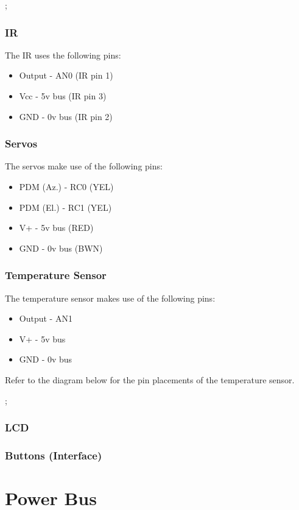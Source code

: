 \documentclass[]{report}
\begin{document}
;
\label{PanTiltPins}

\subsection{IR}
The IR uses the following pins:
\begin{itemize}
	\item Output - AN0 (IR pin 1)
	\item Vcc - 5v bus (IR pin 3)
	\item GND - 0v bus (IR pin 2)
\end{itemize}

\subsection{Servos}
The servos make use of the following pins:
\begin{itemize}
	\item PDM (Az.) - RC0 (YEL)
	\item PDM (El.) - RC1 (YEL)
	\item V+ - 5v bus (RED)
	\item GND - 0v bus (BWN)
\end{itemize}

\subsection{Temperature Sensor}
The temperature sensor makes use of the following pins:
\begin{itemize}
	\item Output - AN1 
	\item V+ - 5v bus
	\item GND - 0v bus
\end{itemize}
Refer to the diagram below for the pin placements of the temperature sensor.

;
\label{TempSensorPins}


\subsection{LCD}

\subsection{Buttons (Interface)}

\chapter{Power Bus}
\end{document}
